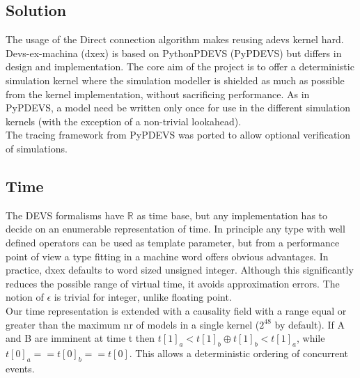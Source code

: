 \subsection{Solution} 
The usage of the Direct connection algorithm makes reusing adevs kernel hard. Devs-ex-machina (dxex) is based on PythonPDEVS \cite{PythonPDEVS}(PyPDEVS) but differs in design and implementation.
The core aim of the project is to offer a deterministic simulation kernel where the simulation modeller is shielded as much as possible from the kernel implementation, without sacrificing performance. As in PyPDEVS, a model need be written only once for use in the different simulation kernels (with the exception of a non-trivial lookahead).\\
The tracing framework from PyPDEVS was ported to allow optional verification of simulations. 
\subsection{Time}
The DEVS formalisms have $\mathbb{R}$ as time base, but any implementation has to decide on an enumerable representation of time. In principle any type with well defined operators can be used as template parameter, but from a performance point of view a type fitting in a machine word offers obvious advantages. In practice, dxex defaults to word sized unsigned integer.
Although this significantly reduces the possible range of virtual time, it avoids approximation errors. The notion of $\epsilon$ is trivial for integer, unlike floating point.\\
Our time representation is extended with a causality field with a range equal or greater than the maximum nr of models in a single kernel ($2^{48}$ by default). If A and B are imminent at time t then $t[1]_a < t[1]_b \oplus t[1]_b < t[1]_a$, while $t[0]_a == t[0]_b == t[0]$. This allows a deterministic ordering of concurrent events. %
